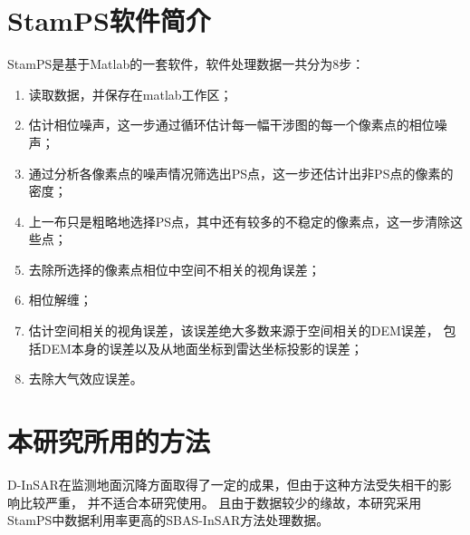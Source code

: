 \section{StamPS软件简介}
StamPS是基于Matlab的一套软件，软件处理数据一共分为8步：
\begin{enumerate}
    \item 读取数据，并保存在matlab工作区；
    \item 估计相位噪声，这一步通过循环估计每一幅干涉图的每一个像素点的相位噪声；
    \item 通过分析各像素点的噪声情况筛选出PS点，这一步还估计出非PS点的像素的密度；
    \item 上一布只是粗略地选择PS点，其中还有较多的不稳定的像素点，这一步清除这些点；
    \item 去除所选择的像素点相位中空间不相关的视角误差；
    \item 相位解缠；
    \item 估计空间相关的视角误差，该误差绝大多数来源于空间相关的DEM误差，
    包括DEM本身的误差以及从地面坐标到雷达坐标投影的误差；
    \item 去除大气效应误差。
\end{enumerate}

\section{本研究所用的方法}
D-InSAR在监测地面沉降方面取得了一定的成果，但由于这种方法受失相干的影响比较严重，
并不适合本研究使用。
且由于数据较少的缘故，本研究采用StamPS中数据利用率更高的SBAS-InSAR\cite{hooperMultitemporalInSARMethod2008}方法处理数据。
